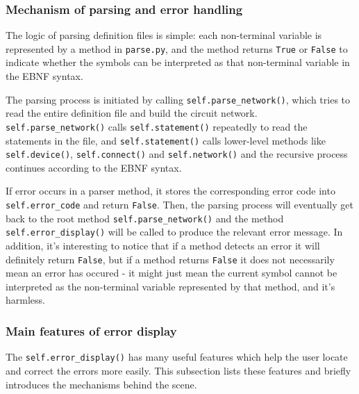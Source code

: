 \documentclass[10pt,a4paper]{article}
\begin{document}
\subsubsection{Mechanism of parsing and error handling}
\label{sec:orga814427}

The logic of parsing definition files is simple: each non-terminal
variable is represented by a method in \texttt{parse.py}, and the method
returns \texttt{True} or \texttt{False} to indicate whether the symbols can be
interpreted as that non-terminal variable in the EBNF syntax.

The parsing process is initiated by calling \texttt{self.parse\_network()},
which tries to read the entire definition file and build the circuit
network. \texttt{self.parse\_network()} calls \texttt{self.statement()} repeatedly to
read the statements in the file, and \texttt{self.statement()} calls
lower-level methods like \texttt{self.device()}, \texttt{self.connect()} and
\texttt{self.network()} and the recursive process continues according to the
EBNF syntax. 

If error occurs in a parser method, it stores the corresponding error
code into \texttt{self.error\_code} and return \texttt{False}. Then, the parsing
process will eventually get back to the root method
\texttt{self.parse\_network()} and the method \texttt{self.error\_display()} will be
called to produce the relevant error message. In addition, it's
interesting to notice that if a method detects an error it will
definitely return \texttt{False}, but if a method returns \texttt{False} it does not
necessarily mean an error has occured - it might just mean the current
symbol cannot be interpreted as the non-terminal variable represented
by that method, and it's harmless.

\subsubsection{Main features of error display}
\label{sec:org2a74204}

The \texttt{self.error\_display()} has many useful features which help the
user locate and correct the errors more easily. This subsection lists
these features and briefly introduces the mechanisms behind the scene.
\end{document}
